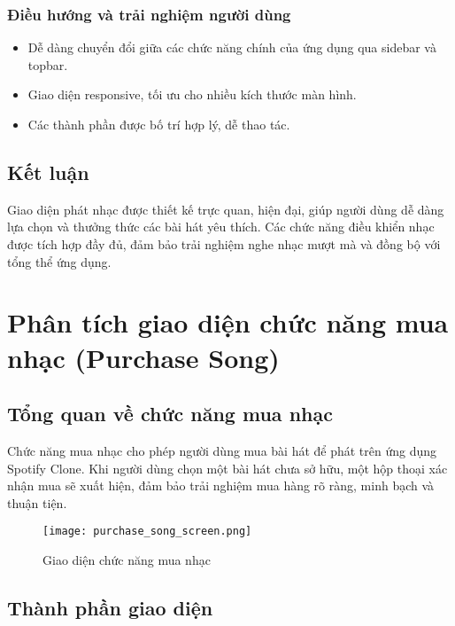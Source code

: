 \documentclass{book}
\let\oldsection\section
\renewcommand{\section}{\clearpage\oldsection}
\begin{document}
\subsubsection{Điều hướng và trải nghiệm người dùng}
\begin{itemize}
    \item Dễ dàng chuyển đổi giữa các chức năng chính của ứng dụng qua sidebar và topbar.
    \item Giao diện responsive, tối ưu cho nhiều kích thước màn hình.
    \item Các thành phần được bố trí hợp lý, dễ thao tác.
\end{itemize}

\subsection{Kết luận}
Giao diện phát nhạc được thiết kế trực quan, hiện đại, giúp người dùng dễ dàng lựa chọn và thưởng thức các bài hát yêu thích. Các chức năng điều khiển nhạc được tích hợp đầy đủ, đảm bảo trải nghiệm nghe nhạc mượt mà và đồng bộ với tổng thể ứng dụng.

\section{Phân tích giao diện chức năng mua nhạc (Purchase Song)}

\subsection{Tổng quan về chức năng mua nhạc}
Chức năng mua nhạc cho phép người dùng mua bài hát để phát trên ứng dụng Spotify Clone. Khi người dùng chọn một bài hát chưa sở hữu, một hộp thoại xác nhận mua sẽ xuất hiện, đảm bảo trải nghiệm mua hàng rõ ràng, minh bạch và thuận tiện.

\begin{figure}[h!]
\centering
\texttt{[image: purchase\_song\_screen.png]} %
\caption{Giao diện chức năng mua nhạc}
\label{fig:purchasesong}
\end{figure}

\subsection{Thành phần giao diện}
\end{document}
